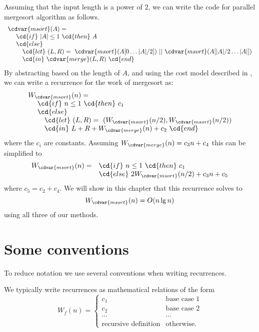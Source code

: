 \begin{example}
\label{ex:analysis::recurrences::mergesort} 
Assuming that the input length is a power of $2$, we can write the code for parallel mergesort algorithm as follows.
\[
\begin{array}{l}
\cdvar{msort}(A) = 
\\
~~~~\cd{if}~|A| \leq 1~\cd{then}~A 
\\
~~~~\cd{else}
\\
~~~~~~~\cd{let}~(L,R) 
  =~\cdvar{msort}(A[0 \dots |A|/2])~||~\cdvar{msort}(A[|A|/2 \dots|A|]) 
\\
~~~~~~~\cd{in}~\cdvar{merge}(L,R)~\cd{end}
\end{array}
\]
By abstracting based on the length of $A$, and using the cost model
described in , we can write a recurrence for the work of mergesort as:
\[
\begin{array}{l}
W_{\cdvar{msort}}(n) = 
\\
~~~~\cd{if}~n \leq 1~\cd{then}~c_1
\\
~~~~\cd{else}
\\
~~~~~~~\cd{let}~(L,R) 
  =~(W_{\cdvar{msort}}(n/2), W_{\cdvar{msort}}(n/2)) 
\\
~~~~~~~\cd{in}~L + R + W_{\cdvar{merge}}(n)+ c_2~\cd{end}
\end{array}
\]
where the $c_i$ are constants.    Assuming 
$W_{\cdvar{merge}}(n) = c_3 n + c_4$ this can be simplified to
\[
\begin{array}{ll}
W_{\cdvar{msort}}(n) = &\cd{if}~n \leq 1~\cd{then}~c_1
\\
&\cd{else}~2 W_{\cdvar{msort}}(n/2) + c_3 n + c_5
\end{array}
\]
where $c_5 = c_2 + c_4$.    We will show in this chapter that this
recurrence solves to
\[W_{\cdvar{msort}}(n) = O(n \lg n) \]
using all three of our methods.
\end{example}

\section{Some conventions}
\begin{gram}
To reduce notation we use several conventions when writing recurrences.
\end{gram}

\begin{gram}[Syntax]
We typically write recurrences as mathematical relations of the form
\[
W_f(n) = \left\{
\begin{array}{lll}
c_1 & \mbox{base case 1} 
\\
c_2 & \mbox{base case 2} 
\\
\cdots& \cdots
\\
\mbox{recursive definition}  &  \mbox{otherwise}.
\end{array}
\right. 
\]
%
\end{gram}
%

